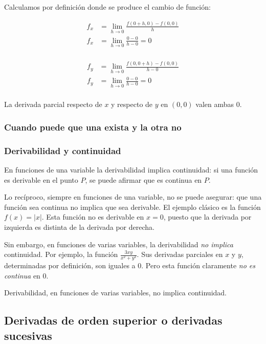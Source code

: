 Calculamos por definición donde se produce el cambio de función:

\begin{align*}
    f_x & = \lim_{h \to 0}\frac{f(0 + h,0) - f(0,0)}{h}   \\
    f_x & = \lim_{h \to 0}\frac{0 - 0}{h - 0} = \boxed{0} \\
\end{align*}

\begin{align*}
    f_y & = \lim_{h \to 0}\frac{f(0,0 + h) - f(0,0)}{h - 0} \\
    f_y & = \lim_{h \to 0}\frac{0 - 0}{h - 0} = \boxed{0}   \\
\end{align*}

La derivada parcial respecto de \(x\) y respecto de \(y\) en \((0,0)\) valen
ambas 0.

\subsubsection{Cuando puede que una exista y la otra no}

\subsubsection{Derivabilidad y continuidad}

En funciones de una variable la derivabilidad implica continuidad:
si una función es derivable en el punto \(P\),
se puede afirmar que es continua en \(P\).

Lo recíproco, siempre en funciones de una variable,
no se puede asegurar:
que una función sea continua no implica que sea derivable.
El ejemplo clásico es la función \(f(x) = |x|\).
Esta función no es derivable en \(x = 0\),
puesto que la derivada por izquierda es distinta de la derivada por derecha.

Sin embargo,
en funciones de varias variables,
la derivabilidad \textit{no implica} continuidad.
Por ejemplo, la función \(\frac{3xy}{x^{2} + y^{2}}\).
Sus derivadas parciales en \(x\) y \(y\),
determinadas por definición,
son iguales a 0.
Pero esta función claramente \textit{no es continua} en 0.

Derivabilidad,
en funciones de varias variables,
no implica continuidad.

\subsection{Derivadas de orden superior o derivadas sucesivas}

